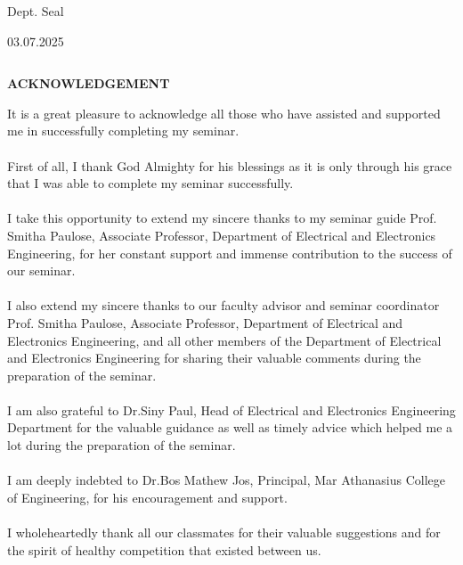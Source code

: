 \documentclass[12pt,a4paper]{report}
\begin{document}
\vspace{0.99in}
\begin{center}
Dept. Seal
\end{center}
\begin{center}
 03.07.2025   
\end{center}


\newpage
{}
\setcounter{page}{1}
\begin{verbatim}
\end{verbatim}
\begin{center}
\textbf {\large ACKNOWLEDGEMENT}
\end{center}
\vspace{0.4125in}


\noindent It is a great pleasure to acknowledge all those who have assisted and supported me in successfully completing my seminar. \\ 
\\
\noindent
First of all, I thank God Almighty for his blessings as it is only through his grace that I was able to complete my seminar successfully.\\
\\
\noindent 
I take this opportunity to extend my sincere thanks to my seminar guide Prof. Smitha Paulose, Associate Professor, Department of Electrical and  Electronics Engineering, for her constant support and immense contribution to the success of our seminar.  \\
\\
\noindent
I also extend my sincere thanks to our faculty advisor and seminar coordinator Prof. Smitha Paulose, Associate Professor, Department of Electrical and Electronics Engineering, and all other members of the Department of Electrical and Electronics Engineering for sharing their valuable comments during the preparation of the seminar.\\
\\
\noindent
I am also grateful to Dr.Siny Paul, Head of Electrical and Electronics Engineering Department for the valuable guidance as well as timely advice which helped me a lot during the preparation of the seminar.\\
\\
\noindent I am deeply indebted to Dr.Bos Mathew Jos, Principal, Mar Athanasius College of Engineering, for his encouragement and support.\\
\\
\noindent
I wholeheartedly thank all our classmates for their valuable suggestions and for the spirit of healthy competition that existed between us. 
\end{document}
